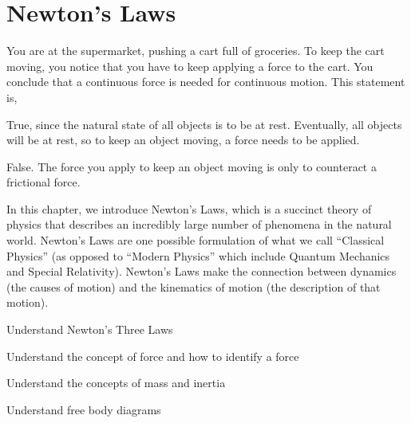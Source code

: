 
\chapter{Newton's Laws}
\label{chap:NewtonsLaws}

\begin{opening}
\begin{MCquestion}{You are at the supermarket, pushing a cart full of groceries. To keep the cart moving, you notice that you have to keep applying a force to the cart. You conclude that a continuous force is needed for continuous motion. This statement is,}
\item True, since the natural state of all objects is to be at rest. Eventually, all objects will be at rest, so to keep an object moving, a force needs to be applied.
\item False. The force you apply to keep an object moving is only to counteract a frictional force.
\end{MCquestion}
\end{opening}
In this chapter, we introduce Newton's Laws, which is a succinct theory of physics that describes an incredibly large number of phenomena in the natural world. Newton's Laws are one possible formulation of what we call ``Classical Physics'' (as opposed to ``Modern Physics'' which include Quantum Mechanics and Special Relativity). Newton's Laws make the connection between dynamics (the causes of motion) and the kinematics of motion (the description of that motion). 
 \vspace{1cm}
\begin{learningObjectives}
{\item Understand Newton's Three Laws
\item Understand the concept of force and how to identify a force
\item Understand the concepts of mass and inertia
\item Understand free body diagrams}
\end{learningObjectives}

